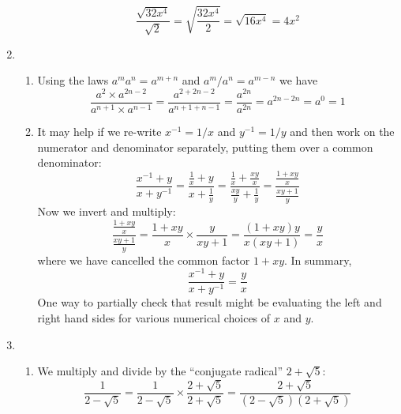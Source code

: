 \documentclass{article}
\begin{document}
\begin{enumerate}
\begin{enumerate}
    \begin{equation*}
      \frac{\sqrt{32x^4}}{\sqrt{2}} = \sqrt{\frac{32x^4}{2}}
      = \sqrt{16x^4} = 4x^2
    \end{equation*}
  \end{enumerate}
\item %
  \begin{enumerate}
  \item Using the laws $a^m a^n = a^{m+n}$ and $a^m/a^n = a^{m-n}$ we have
    \begin{equation*}
      \frac{a^2\times a^{2n-2}}{a^{n+1}\times a^{n-1}}
      = \frac{a^{2+2n-2}}{a^{n+1+n-1}}
      = \frac{a^{2n}}{a^{2n}}
      = a^{2n-2n} = a^0 = 1
    \end{equation*}
  \item\label{prob:fracstack} %
    It may help if we re-write $x^{-1}=1/x$ and $y^{-1}=1/y$ and
    then work on the numerator and denominator separately, putting them
    over a common denominator:
    \begin{equation*}
      \frac{x^{-1}+y}{x+y^{-1}}
      = \frac{\frac{1}{x} + y}{x+\frac{1}{y}}
      = \frac{\frac{1}{x} + \frac{xy}{x}} {\frac{xy}{y}+\frac{1}{y}}
      = \frac{\frac{1+xy}{x}} {\frac{xy+1}{y}}
    \end{equation*}
    Now we invert and multiply:
    \begin{equation*}
      \frac{\frac{1+xy}{x}} {\frac{xy+1}{y}}
      = \frac{1+xy}{x} \times \frac{y}{xy+1}
      = \frac{(1+xy)y}{x(xy+1)}
      = \frac{y}{x}
    \end{equation*}
    where we have cancelled the common factor $1+xy$.  In summary,
    \begin{equation*}
      \frac{x^{-1}+y}{x+y^{-1}} = \frac{y}{x}
    \end{equation*}
    One way to partially 
    check that result might be evaluating the left and right hand
    sides for various numerical choices of $x$ and $y$.
  \end{enumerate}
\item %
  \begin{enumerate}
  \item We multiply and divide by the ``conjugate radical'' $2+\sqrt{5}$:
    \begin{equation*}
      \frac{1}{2-\sqrt{5}} =
      \frac{1}{2-\sqrt{5}} \times \frac{2+\sqrt{5}}{2+\sqrt{5}}
      = \frac{2+\sqrt{5}}{(2-\sqrt{5})(2+\sqrt{5})}

\end{equation*}
\end{enumerate}
\end{enumerate}
\end{document}

